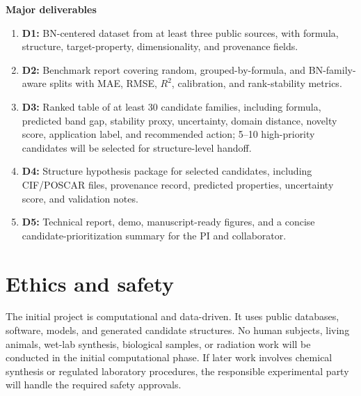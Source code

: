 \documentclass[10pt]{article}
\begin{document}
\textbf{Major deliverables}
\begin{enumerate}
  \item \textbf{D1:} BN-centered dataset from at least three public sources, with formula, structure, target-property, dimensionality, and provenance fields.
  \item \textbf{D2:} Benchmark report covering random, grouped-by-formula, and BN-family-aware splits with MAE, RMSE, $R^2$, calibration, and rank-stability metrics.
  \item \textbf{D3:} Ranked table of at least 30 candidate families, including formula, predicted band gap, stability proxy, uncertainty, domain distance, novelty score, application label, and recommended action; 5--10 high-priority candidates will be selected for structure-level handoff.
  \item \textbf{D4:} Structure hypothesis package for selected candidates, including CIF/POSCAR files, provenance record, predicted properties, uncertainty score, and validation notes.
  \item \textbf{D5:} Technical report, demo, manuscript-ready figures, and a concise candidate-prioritization summary for the PI and collaborator.
\end{enumerate}

\section*{Ethics and safety}
The initial project is computational and data-driven. It uses public databases, software, models, and generated candidate structures. No human subjects, living animals, wet-lab synthesis, biological samples, or radiation work will be conducted in the initial computational phase. If later work involves chemical synthesis or regulated laboratory procedures, the responsible experimental party will handle the required safety approvals.
\end{document}
